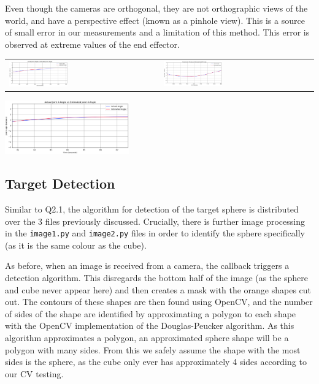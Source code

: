 \documentclass[11pt]{article}
\begin{document}
Even though the cameras are orthogonal, they are not orthographic views of the world, and have a perspective effect (known as a pinhole view). This is a source of small error in our measurements and a limitation of this method. This error is observed at extreme values of the end effector.

\begin{center}
    \begin{tabular}{ll}
        \includegraphics[width=0.4\textwidth]{images/2.1_joint2.png}
        &
        \includegraphics[width=0.4\textwidth]{images/2.1_joint3.png}
    \end{tabular}
    \includegraphics[width=0.4\textwidth]{images/2.1_joint4.png}
\end{center}

\subsection{Target Detection}
Similar to Q2.1, the algorithm for detection of the target sphere is distributed over the 3 files previously discussed. Crucially, there is further image processing in the \texttt{image1.py} and \texttt{image2.py} files in order to identify the sphere specifically (as it is the same colour as the cube).

As before, when an image is received from a camera, the callback triggers a detection algorithm. This disregards the bottom half of the image (as the sphere and cube never appear here) and then creates a mask with the orange shapes cut out. The contours of these shapes are then found using OpenCV, and the number of sides of the shape are identified by approximating a polygon to each shape with the OpenCV implementation of the Douglas-Peucker algorithm. As this algorithm approximates a polygon, an approximated sphere shape will be a polygon with many sides. From this we safely assume the shape with the most sides is the sphere, as the cube only ever has approximately 4 sides according to our CV testing. 
\end{document}
